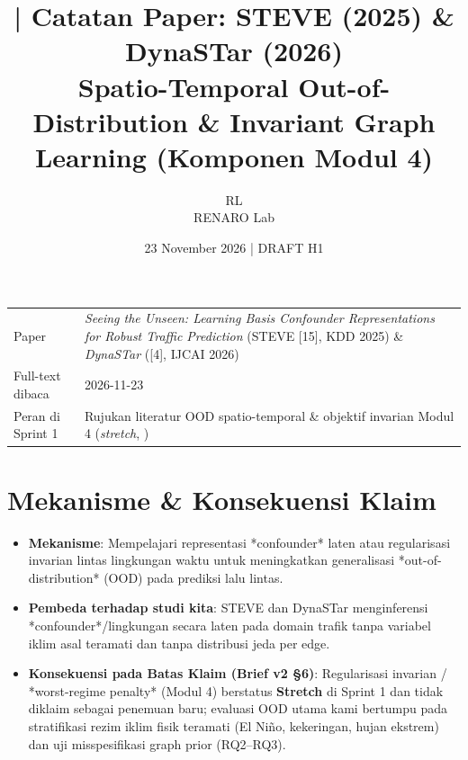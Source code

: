 \documentclass[11pt,a4paper]{article}
\title{\jobid{RL-H1-02} | Catatan Paper: STEVE (2025) \& DynaSTar (2026)\\
\large Spatio-Temporal Out-of-Distribution \& Invariant Graph Learning (Komponen Modul 4)}
\author{RL \\ \small RENARO Lab}
\date{23 November 2026 \quad | \quad \textcolor{blue!65!black}{DRAFT H1}}
\begin{document}
\maketitle

\begin{table}[H]
\centering
\small
\begin{tabular}{@{}L{3.4cm}L{11.2cm}@{}}
\toprule
Paper & \emph{Seeing the Unseen: Learning Basis Confounder Representations for Robust Traffic Prediction} (STEVE [15], KDD 2025) \& \emph{DynaSTar} ([4], IJCAI 2026) \\
Full-text dibaca & 2026-11-23 \\
Peran di Sprint 1 & Rujukan literatur OOD spatio-temporal \& objektif invarian Modul 4 (\emph{stretch}, ) \\
\bottomrule
\end{tabular}
\end{table}

\section{Mekanisme \& Konsekuensi Klaim}
\begin{itemize}
  \item \textbf{Mekanisme}: Mempelajari representasi *confounder* laten atau regularisasi invarian lintas lingkungan waktu untuk meningkatkan generalisasi *out-of-distribution* (OOD) pada prediksi lalu lintas.
  \item \textbf{Pembeda terhadap studi kita}: STEVE dan DynaSTar menginferensi *confounder*/lingkungan secara laten pada domain trafik tanpa variabel iklim asal teramati dan tanpa distribusi jeda per edge.
  \item \textbf{Konsekuensi pada Batas Klaim (Brief v2 \S6)}: Regularisasi invarian / *worst-regime penalty* (Modul 4) berstatus \textbf{Stretch} di Sprint 1 dan tidak diklaim sebagai penemuan baru; evaluasi OOD utama kami bertumpu pada stratifikasi rezim iklim fisik teramati (El Ni\~no, kekeringan, hujan ekstrem) dan uji misspesifikasi graph prior (RQ2--RQ3).
\end{itemize}
\end{document}
